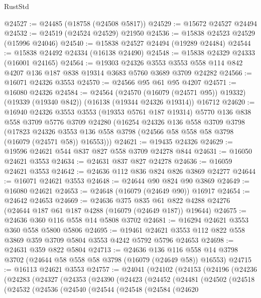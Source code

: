 \begin{lexlean}{RustStd}
\begin{coremodule}
@24527 := @24485 (@18758 (@24508 @5817))
@24529 := @15672 @24527 @24494
@24532 := @24519 (@24524 @24529) @21950
@24536 := @15838 @24523 @24529 (@15996 @24046)
@24540 := @15838 @24527 @24494 (@19289 @24484)
@24544 := @15838 @24492 @24334 (@16138 @24490)
@24548 := @15838 @24329 @24333 (@16001 @24165)
@24564 := @19303
    @24326
    @3553
    @3553
    @558
    @114
    @842
    @4207
    @136
    @187
    @838
    @19314
    @3683
    @5760
    @3689
    @3709
    @24282
@24566 := @16071 @24326 @3553
@24570 := @24566 @95 @61 @95 @4207
@24571 := @16080 @24326
@24584 := @24564
    (@24570 (@16079 (@24571 @95)) @19332)
    (@19339 (@19340 @842))
    (@16138 (@19344 @24326 @19314))
    @16712
@24620 := @16940
    @24326
    @3553
    @3553
    (@19353 @5761 @187 @19314)
    @5770
    @136
    @838
    @558
    @3709
    @5776
    @3709
    @24280
    (@16254
      @24326
      @136
      @558
      @3709
      @3798
      (@17823
        @24326
        @3553
        @136
        @558
        @3798
        (@24566 @58 @558 @58 @3798 (@16079 (@24571 @58)) @16553)))
@24621 := @19435 @24326
@24629 := @19596 @24621 @544 @837 @827 @558 @3709 @24278 @844
@24631 := @16050 @24621 @3553
@24634 := @24631 @837 @827 @24278
@24636 := @16059 @24621 @3553
@24642 := @24636 @112 @836 @824 @826 @3869 @24277
@24644 := @16071 @24621 @3553
@24648 := @24644 @90 @824 @90 @3869
@24649 := @16080 @24621
@24653 := @24648 (@16079 (@24649 @90)) @16917
@24654 := @24642 @24653
@24669 := @24636
    @375
    @835
    @61
    @822
    @4288
    @24276
    (@24644 @187 @61 @187 @4288 (@16079 (@24649 @187)) @19644)
@24675 := @24636 @360 @116 @558 @14 @5808 @3702
@24681 := @16294 @24621 @3553 @360 @558 @5800 @5806
@24695 := @19461 @24621 @3553 @112 @822 @558 @3869 @359 @3709 @5804 @3553 @4242 @5792 @5796 @24653
@24698 := @24631 @359 @822 @5804
@24713 := @24636
    @136
    @116
    @558
    @14
    @3798
    @3702
    (@24644 @58 @558 @58 @3798 (@16079 (@24649 @58)) @16553)
@24715 := @16113 @24621 @3553
@24757 := @24041
    (@24102
      (@24153
        (@24196
          (@24236
            (@24283
              (@24327
                (@24353
                  (@24390
                    (@24423
                      (@24452
                        (@24481
                          (@24502
                            (@24518
                              (@24532
                                (@24536
                                  (@24540
                                    (@24544
                                      (@24548
                                        (@24584
                                          (@24620

\end{coremodule}
\end{lexlean}
